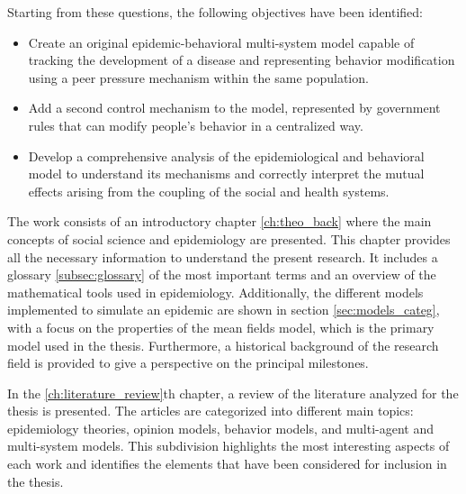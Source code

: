 Starting from these questions, the following objectives have been identified:
\begin{itemize}
	\item Create an original epidemic-behavioral multi-system model capable of tracking the development of a disease and representing behavior modification using a peer pressure mechanism within the same population.
	\item Add a second control mechanism to the model, represented by government rules that can modify people's behavior in a centralized way.
	\item Develop a comprehensive analysis of the epidemiological and behavioral model to understand its mechanisms and correctly interpret the mutual effects arising from the coupling of the social and health systems.
\end{itemize}
The work consists of an introductory chapter \ref{ch:theo_back} where the main concepts of social science and epidemiology are presented. This chapter provides all the necessary information to understand the present research. It includes a glossary \ref{subsec:glossary} of the most important terms and an overview of the mathematical tools used in epidemiology. Additionally, the different models implemented to simulate an epidemic are shown in section \ref{sec:models_categ}, with a focus on the properties of the mean fields model, which is the primary model used in the thesis. Furthermore, a historical background of the research field is provided to give a perspective on the principal milestones.

In the \ref{ch:literature_review}th chapter, a review of the literature analyzed for the thesis is presented. The articles are categorized into different main topics: epidemiology theories, opinion models, behavior models, and multi-agent and multi-system models. This subdivision highlights the most interesting aspects of each work and identifies the elements that have been considered for inclusion in the thesis.

